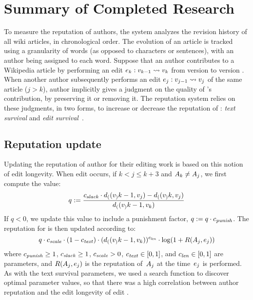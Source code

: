 \section{Summary of Completed Research}

To measure the reputation of authors, the system analyzes
the revision history of all wiki articles, in
chronological order.
The evolution of an article is tracked using a granularity
of words (as opposed to characters or sentences),
with an author being assigned to each word.
Suppose that an author  contributes to a Wikipedia article by
performing an edit $e_{k}: v_{k-1} \rightsquigarrow v_{k}$
from version  to
version .
When another author  subsequently performs an edit
$e_{j}: v_{j-1} \rightsquigarrow v_{j}$
of the same article ($j > k$), author 
implicitly gives a judgment on the quality of 's contribution, by
preserving it or removing it.
The reputation system relies on these judgments, in two forms, to increase
or decrease the reputation of : \textit{text survival}
and \textit{edit survival}~\cite{Adler2007}.

\subsection{Reputation update}

  Updating the reputation of author  for their editing
  work is based on this notion of edit longevity.
  When edit  occurs, if
  $k < j \le k+3$ and $A_{k} \ne A_{j}$,
  we first compute the value:
  \begin{equation*}
  	q := \frac{ {c_{{\text{\textit{slack}}}}} \cdot d_{(}(v_{)}{k-1},v_{j})
		- d_{(}(v_{)}{k},v_{j}) }
		{ d_{(}(v_{)}{k-1},v_{k}) }
  \end{equation*}
  If $q < 0$, we update this value to include a punishment factor,
  $q := q \cdot {c_{{\text{\textit{punish}}}}}$.
  The reputation for  is then updated according to:
  \begin{equation*}
  	q \cdot {c_{{\text{\textit{scale}}}}} \cdot (1 - {c_{{\text{\textit{text}}}}}) \cdot
	        (d_{(}(v_{)}{k-1},v_{k}))^{c_{{\text{\textit{len}}}}}
		\cdot \log(1 + R(A_{j},e_{j}))
  \end{equation*}
  where ${c_{{\text{\textit{punish}}}}} \geq 1$, ${c_{{\text{\textit{slack}}}}} \geq 1$, ${c_{{\text{\textit{scale}}}}} > 0$,
  ${c_{{\text{\textit{text}}}}} \in [0,1]$, and ${c_{{\text{\textit{len}}}}} \in [0,1]$ are parameters,
  and $R(A_{j},e_{j})$ is the reputation
  of~$A_{j}$ at the time~$e_{j}$ is performed.
  As with the text survival parameters, we used a search function
  to discover optimal parameter values, so that there was a high
  correlation between author reputation and the edit longevity
  of edit .


